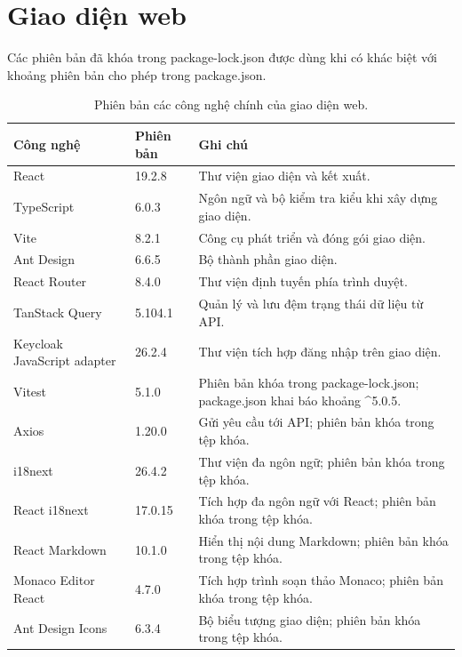 \documentclass[../BTL.tex]{subfiles}
\begin{document}
\section{Giao diện web}

Các phiên bản đã khóa trong \textnormal{package-lock.json} được dùng khi có khác biệt với khoảng phiên bản cho phép trong \textnormal{package.json}.

\begin{table}[H]
\centering
\small
\begin{tabularx}{\textwidth}{|p{3.5cm}|p{2.4cm}|X|}
\hline
Công nghệ & Phiên bản & Ghi chú \\ \hline
React & 19.2.8 & Thư viện giao diện và kết xuất. \\ \hline
TypeScript & 6.0.3 & Ngôn ngữ và bộ kiểm tra kiểu khi xây dựng giao diện. \\ \hline
Vite & 8.2.1 & Công cụ phát triển và đóng gói giao diện. \\ \hline
Ant Design & 6.6.5 & Bộ thành phần giao diện. \\ \hline
React Router & 8.4.0 & Thư viện định tuyến phía trình duyệt. \\ \hline
TanStack Query & 5.104.1 & Quản lý và lưu đệm trạng thái dữ liệu từ API. \\ \hline
Keycloak JavaScript adapter & 26.2.4 & Thư viện tích hợp đăng nhập trên giao diện. \\ \hline
Vitest & 5.1.0 & Phiên bản khóa trong \textnormal{package-lock.json}; \textnormal{package.json} khai báo khoảng \textnormal{\textasciicircum 5.0.5}. \\ \hline
Axios & 1.20.0 & Gửi yêu cầu tới API; phiên bản khóa trong tệp khóa. \\ \hline
i18next & 26.4.2 & Thư viện đa ngôn ngữ; phiên bản khóa trong tệp khóa. \\ \hline
React i18next & 17.0.15 & Tích hợp đa ngôn ngữ với React; phiên bản khóa trong tệp khóa. \\ \hline
React Markdown & 10.1.0 & Hiển thị nội dung Markdown; phiên bản khóa trong tệp khóa. \\ \hline
Monaco Editor React & 4.7.0 & Tích hợp trình soạn thảo Monaco; phiên bản khóa trong tệp khóa. \\ \hline
Ant Design Icons & 6.3.4 & Bộ biểu tượng giao diện; phiên bản khóa trong tệp khóa. \\ \hline
\end{tabularx}
\caption{Phiên bản các công nghệ chính của giao diện web.}
\label{tab:versions-frontend}
\end{table}
\end{document}

